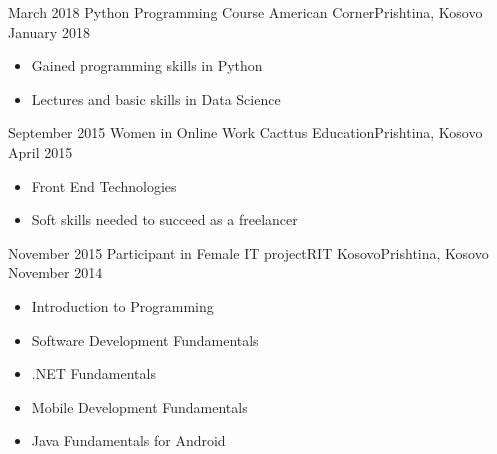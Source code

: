 %
%
%

  \emptySeparator
  \emptySeparator


\begin{experiences}

 \experience
    {March 2018}   {Python Programming Course
}{American Corner}{Prishtina, Kosovo}
    {January 2018} {
                      \begin{itemize}
                        \item Gained programming skills in Python
\item Lectures and basic skills in Data Science          
             
                      \end{itemize}
                    }



\emptySeparator
  \experience
    {September 2015}   {Women in Online Work
}{Cacttus Education}{Prishtina, Kosovo}
    {April 2015} {
                      \begin{itemize}
                        \item Front End Technologies
\item Soft skills needed to succeed as a freelancer             
                                                                                       
                      \end{itemize}
                    }


\emptySeparator
  \experience
    {November 2015}   {Participant in Female IT project}{RIT Kosovo}{Prishtina, Kosovo}
    {November 2014} {
                      \begin{itemize}
                        \item Introduction to Programming
                      \item Software Development Fundamentals
\item .NET Fundamentals
\item Mobile Development Fundamentals
\item Java Fundamentals for Android                                                                 
                      \end{itemize}
                    }






\end{experiences}
